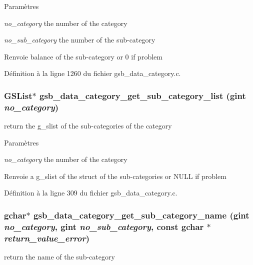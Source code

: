 \begin{DoxyParams}{Paramètres}
\item[{\em no\_\-category}]the number of the category \item[{\em no\_\-sub\_\-category}]the number of the sub-\/category\end{DoxyParams}
\begin{DoxyReturn}{Renvoie}
balance of the sub-\/category or 0 if problem 
\end{DoxyReturn}


Définition à la ligne 1260 du fichier gsb\_\-data\_\-category.c.

\subsubsection[{gsb\_\-data\_\-category\_\-get\_\-sub\_\-category\_\-list}]{\setlength{\rightskip}{0pt plus 5cm}GSList$\ast$ gsb\_\-data\_\-category\_\-get\_\-sub\_\-category\_\-list (gint {\em no\_\-category})}\label{gsb__data__category_8c_a5b6c6e3288cd0e25f28dd9ac1af6979f}
return the g\_\-slist of the sub-\/categories of the category


\begin{DoxyParams}{Paramètres}
\item[{\em no\_\-category}]the number of the category\end{DoxyParams}
\begin{DoxyReturn}{Renvoie}
a g\_\-slist of the struct of the sub-\/categories or NULL if problem 
\end{DoxyReturn}


Définition à la ligne 309 du fichier gsb\_\-data\_\-category.c.

\subsubsection[{gsb\_\-data\_\-category\_\-get\_\-sub\_\-category\_\-name}]{\setlength{\rightskip}{0pt plus 5cm}gchar$\ast$ gsb\_\-data\_\-category\_\-get\_\-sub\_\-category\_\-name (gint {\em no\_\-category}, \/  gint {\em no\_\-sub\_\-category}, \/  const gchar $\ast$ {\em return\_\-value\_\-error})}\label{gsb__data__category_8c_a3b5bc5fb4125a2e3e8df0c922cbee149}
return the name of the sub-\/category


